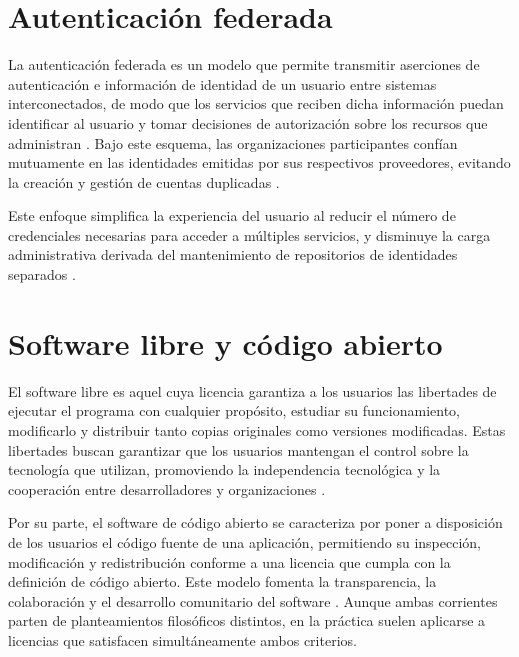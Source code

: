 \section{Autenticación federada}

La autenticación federada es un modelo que permite transmitir aserciones de autenticación e información de identidad de un usuario entre sistemas interconectados, de modo que los servicios que reciben dicha información puedan identificar al usuario y tomar decisiones de autorización sobre los recursos que administran \citep{NIST80063v4}. Bajo este esquema, las organizaciones participantes confían mutuamente en las identidades emitidas por sus respectivos proveedores, evitando la creación y gestión de cuentas duplicadas \citep{Prout2019}.

Este enfoque simplifica la experiencia del usuario al reducir el número de credenciales necesarias para acceder a múltiples servicios, y disminuye la carga administrativa derivada del mantenimiento de repositorios de identidades separados \citep{Felts2023}.

\section{Software libre y código abierto}

El software libre es aquel cuya licencia garantiza a los usuarios las libertades de ejecutar el programa con cualquier propósito, estudiar su funcionamiento, modificarlo y distribuir tanto copias originales como versiones modificadas. Estas libertades buscan garantizar que los usuarios mantengan el control sobre la tecnología que utilizan, promoviendo la independencia tecnológica y la cooperación entre desarrolladores y organizaciones \citep{FSF2026}.

Por su parte, el software de código abierto se caracteriza por poner a disposición de los usuarios el código fuente de una aplicación, permitiendo su inspección, modificación y redistribución conforme a una licencia que cumpla con la definición de código abierto. Este modelo fomenta la transparencia, la colaboración y el desarrollo comunitario del software \citep{OSI2026}. Aunque ambas corrientes parten de planteamientos filosóficos distintos, en la práctica suelen aplicarse a licencias que satisfacen simultáneamente ambos criterios.
